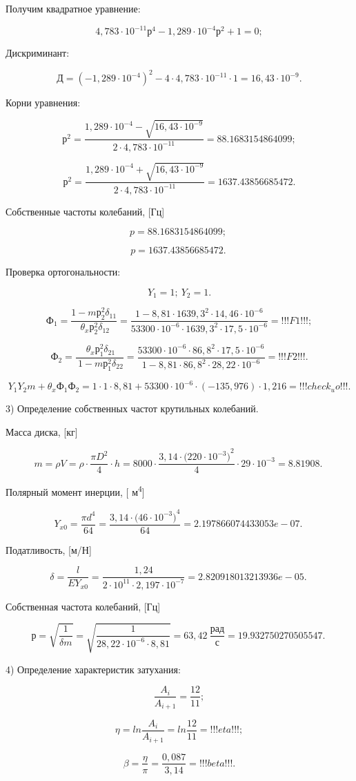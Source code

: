 Получим квадратное уравнение:

\[4,783\cdot10^{- 11}р^{4} - 1,289\cdot10^{- 4}р^{2} + 1 = 0;\]

Дискриминант:

\[Д = \left( - 1,289\cdot10^{- 4} \right)^{2} - 4\cdot4,783\cdot10^{- 11}\cdot1 = 16,43\cdot10^{- 9}.\]

Корни уравнения:

\[р^{2} = \frac{1,289\cdot10^{- 4} - \sqrt{16,43\cdot10^{- 9}}}{2\cdot4,783\cdot10^{- 11}} = 88.1683154864099;\]

\[р^{2} = \frac{1,289\cdot10^{- 4} + \sqrt{16,43\cdot10^{- 9}}}{2\cdot4,783\cdot10^{- 11}} = 1637.43856685472.\]

Собственные частоты колебаний, [Гц]

\[p  = 88.1683154864099;\ \]

\[p  = 1637.43856685472.\ \]

Проверка ортогональности:

\[Y_{1} = 1;\ Y_{2} = 1.\]

\[Ф_{1} = \frac{1 - mр_{2}^{2}\delta_{11}}{\ \theta_{x}р_{2}^{2}\delta_{12}} = \frac{1 - 8,81\cdot{1639,3}^{2}\cdot14,46\cdot10^{- 6}}{53300\cdot10^{- 6}\cdot{1639,3}^{2}\cdot17,5\cdot10^{- 6}} = !!!F1!!!;\]

\[Ф_{2} = \frac{\ \theta_{x}р_{1}^{2}\delta_{21}}{\ 1 - mр_{1}^{2}\delta_{22}} = \frac{53300\cdot10^{- 6}\cdot{86,8}^{2}\cdot17,5\cdot10^{- 6}}{1 - 8,81\cdot{86,8}^{2}\cdot28,22\cdot10^{- 6}} = !!!F2!!!.\]

\[Y_{1}Y_{2}m + \theta_{x}Ф_{1}Ф_{2} = 1\cdot1\cdot8,81 + 53300\cdot10^{- 6}\cdot( - 135,976)\cdot1,216 = !!!check_uo!!!.\]

3) Определение собственных частот крутильных колебаний.

Масса диска, [кг]

\[m = \rho V = \rho\cdot\frac{\pi D^{2}}{4}\cdot h = 8000\cdot\frac{3,14\cdot({220\cdot10^{- 3})}^{2}}{4}\cdot29\cdot10^{- 3} = 8.81908.\ \]

Полярный момент инерции, [ м\textsuperscript{4}]

\[Y_{x0} = \frac{\pi d^{4}}{64} = \frac{3,14\cdot({46\cdot10^{- 3})}^{4}}{64} = 2.197866074433053e-07.\ \]

Податливость, [м/Н]

\[\delta = \frac{l}{EY_{x0}} = \frac{1,24}{2\cdot10^{11}\cdot2,197\cdot10^{- 7}} = 2.820918013213936e-05.\ \]

Собственная частота колебаний, [Гц]

\[р = \sqrt{\frac{1}{\delta \textit{m}}} = \sqrt{\frac{1}{28,22\cdot10^{- 6}\cdot8,81}} = 63,42\ \frac{рад}{с} = 19.932750270505547.\ \]

4) Определение характеристик затухания:

\[\frac{A_{i}}{A_{i + 1}} = \frac{12}{11};\]

\[\eta = ln\frac{A_{i}}{A_{i + 1}} = ln\frac{12}{11} = !!!eta!!!;\]

\[\beta = \frac{\eta}{\pi} = \frac{0,087}{3,14} = !!!beta!!!.\]


